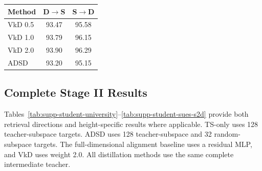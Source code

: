 \par\medskip\noindent\begin{minipage}{\columnwidth}
\captionsetup{type=table}
\centering
\caption{VkD weight sweep and ADSD reference on University-1652. Columns report R@1 (\%).}
\label{tab:supp-vkd}
{\footnotesize\setlength{\tabcolsep}{2pt}\renewcommand{\arraystretch}{1.08}
\begin{tabular*}{\columnwidth}{@{\extracolsep{\fill}}lcc@{}}
\toprule
Method & D$\rightarrow$S & S$\rightarrow$D \\
\midrule
VkD 0.5 & 93.47 & 95.58 \\
VkD 1.0 & 93.79 & 96.15 \\
VkD 2.0 & 93.90 & 96.29 \\
ADSD & 93.20 & 95.15 \\
\bottomrule
\end{tabular*}}
\end{minipage}\par\medskip
\par\medskip\noindent\begin{minipage}{\columnwidth}
\captionsetup{type=table}
\centering
\caption{VkD weight sweep and 128+32 ADSD reference on target datasets. Cells report D$\rightarrow$S R@1/AP (\%).}
\label{tab:supp-vkd-transfer}
{\footnotesize\setlength{\tabcolsep}{2pt}\renewcommand{\arraystretch}{1.08}
}
\end{minipage}\par\medskip

\subsection{Complete Stage II Results}
Tables~\ref{tab:supp-student-university}--\ref{tab:supp-student-sues-s2d} provide both retrieval directions and height-specific results where applicable. TS-only uses 128 teacher-subspace targets. ADSD uses 128 teacher-subspace and 32 random-subspace targets. The full-dimensional alignment baseline uses a residual MLP, and VkD uses weight 2.0. All distillation methods use the same complete intermediate teacher.

